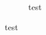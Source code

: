\documentclass{article}
\begin{document}
\begin{figure}
  \caption{test}
\end{figure}

test
\end{document}

